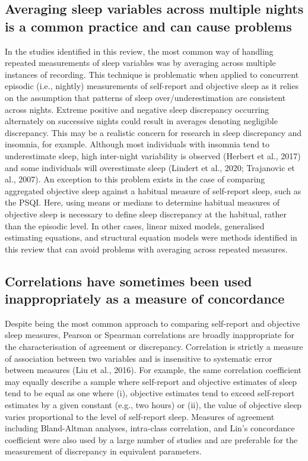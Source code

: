 \documentclass[
]{article}
\begin{document}
\subsection{Averaging sleep variables across multiple nights is a common practice and can cause problems}\label{averaging}

In the studies identified in this review, the most common way of handling repeated measurements of sleep variables was by averaging across multiple instances of recording. This technique is problematic when applied to concurrent episodic (i.e., nightly) measurements of self-report and objective sleep as it relies on the assumption that patterns of sleep over/underestimation are consistent across nights. Extreme positive and negative sleep discrepancy occurring alternately on successive nights could result in averages denoting negligible discrepancy. This may be a realistic concern for research in sleep discrepancy and insomnia, for example. Although most individuals with insomnia tend to underestimate sleep, high inter-night variability is observed (Herbert et al., 2017) and some individuals will overestimate sleep (Lindert et al., 2020; Trajanovic et al., 2007). An exception to this problem exists in the case of comparing aggregated objective sleep against a habitual measure of self-report sleep, such as the PSQI. Here, using means or medians to determine habitual measures of objective sleep is necessary to define sleep discrepancy at the habitual, rather than the episodic level. In other cases, linear mixed models, generalised estimating equations, and structural equation models were methods identified in this review that can avoid problems with averaging across repeated measures.

\subsection{Correlations have sometimes been used inappropriately as a measure of concordance}\label{correlations-have-sometimes-been-used-inappropriately-as-a-measure-of-concordance}

Despite being the most common approach to comparing self-report and objective sleep measures, Pearson or Spearman correlations are broadly inappropriate for the characterisation of agreement or discrepancy. Correlation is strictly a measure of association between two variables and is insensitive to systematic error between measures (Liu et al., 2016). For example, the same correlation coefficient may equally describe a sample where self-report and objective estimates of sleep tend to be equal as one where (i), objective estimates tend to exceed self-report estimates by a given constant (e.g., two hours) or (ii), the value of objective sleep varies proportional to the level of self-report sleep. Measures of agreement including Bland-Altman analyses, intra-class correlation, and Lin's concordance coefficient were also used by a large number of studies and are preferable for the measurement of discrepancy in equivalent parameters.
\end{document}
